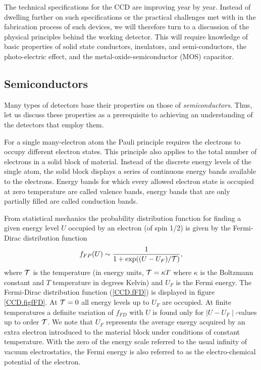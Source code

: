 \documentclass{article}
\def\cl#1{{\cal #1}}               %
\def\labs{\mid\!}
\def\rabs{\!\mid}
\begin{document}
The technical specifications for the CCD are improving year by
year. Instead of dwelling further on such specifications or the
practical challenges met with in the fabrication process of such
devices, we will therefore turn to a discussion of the physical
principles behind the working detector. This will require knowledge of
basic properties of solid state conductors, insulators, and
semi-conductors, the photo-electric effect, and the
metal-oxide-semiconductor (MOS) capacitor.

\subsection*{Semiconductors}

Many types of detectors base their properties on those of {\it
  semiconductors}. Thus, let us discuss these properties as a
prerequisite to achieving an understanding of the detectors that
employ them. 

For a single many-electron atom the Pauli principle requires the
electrons to occupy different electron states. This principle also
applies to the total number of electrons in a solid block of
material. Instead of the discrete energy levels of the single atom,
the solid block displays a series of continuous energy bands available
to the electrons. Energy bands for which every allowed electron state
is occupied at zero temperature are called valence bands, energy bands
that are only partially filled are called conduction bands. 

From statistical mechanics the probability distribution function for
finding a given energy level $U$ occupied by an electron (of spin 1/2)
is given by the Fermi-Dirac distribution function
\begin{equation}
  f_{FP}(U) \sim \frac{1}{1+\exp((U-U_F)/\cl T)},
  \label{CCD.fFD}
\end{equation}
where $\cl T$ is the temperature (in energy units, $\cl T = \kappa T$
where $\kappa$ is the Boltzmann constant and $T$ temperature in
degrees Kelvin) and $U_F$ is the Fermi energy. The Fermi-Dirac
distribution function (\ref{CCD.fFD}) is displayed in figure
\ref{CCD.figfFD}. At $\cl T = 0$ all energy levels up to $U_F$ are
occupied. At finite temperatures a definite variation of $f_{FD}$ with
$U$ is found only for $\labs U - U_F \rabs$-values up to order $\cl
T$. We note that $U_F$ represents the average energy acquired by an
extra electron introduced to the material block under conditions of
constant temperature. With the zero of the energy scale referred to the
usual infinity of vacuum electrostatics, the Fermi energy is also
referred to as the electro-chemical potential of the electron.
\end{document}
